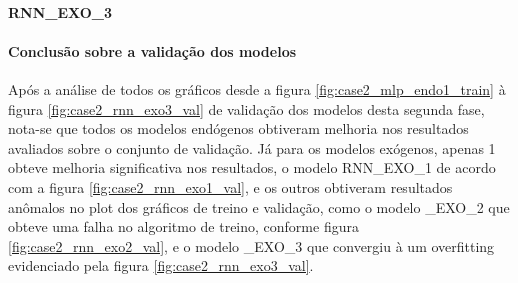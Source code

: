             \paragraph{RNN\_EXO\_3}
            {\begin{center} \begin{minipage}[b]{0.45\textwidth}
    	    \begin{figure}[H]
            \end{figure}\end{minipage} \hfill %
             \begin{minipage}[b]{1.0\textwidth}
            \begin{figure}[H]
            \end{figure}\end{minipage} \end{center} }
            
            \paragraph{Conclusão sobre a validação dos modelos}
    	        Após a análise de todos os gráficos desde a figura \ref{fig:case2_mlp_endo1_train} à figura \ref{fig:case2_rnn_exo3_val} de validação dos modelos desta segunda fase, nota-se que todos os modelos endógenos obtiveram melhoria nos resultados avaliados sobre o conjunto de validação.
    	        Já para os modelos exógenos, apenas 1 obteve melhoria significativa nos resultados, o modelo RNN\_EXO\_1 de acordo com a figura \ref{fig:case2_rnn_exo1_val}, e os outros obtiveram resultados anômalos no plot dos gráficos de treino e validação, como o modelo \RNN\_EXO\_2 que obteve uma falha no algoritmo de treino, conforme figura \ref{fig:case2_rnn_exo2_val}, e o modelo \RNN\_EXO\_3 que convergiu à um overfitting evidenciado pela figura \ref{fig:case2_rnn_exo3_val}.
    	    
